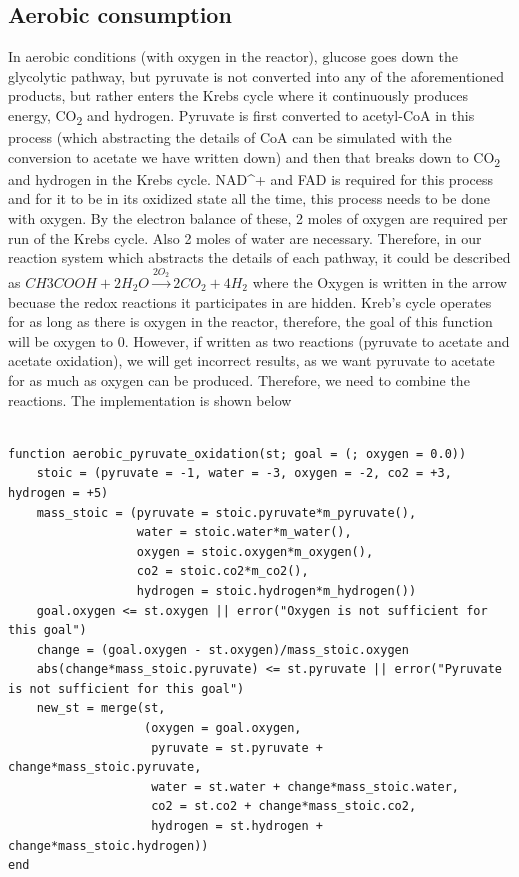 \documentclass[11pt]{article}
\begin{document}
\subsection{Aerobic consumption}
\label{sec:orge4fc921}
In aerobic conditions (with oxygen in the reactor), glucose goes down the glycolytic pathway, but pyruvate is not converted into any of the aforementioned products, but rather enters the Krebs cycle where it continuously produces energy, CO\textsubscript{2} and hydrogen. Pyruvate is first converted to acetyl-CoA in this process (which abstracting the details of CoA can be simulated with the conversion to acetate we have written down) and then that breaks down to CO\textsubscript{2} and hydrogen in the Krebs cycle. NAD\^{}+ and FAD is required for this process and for it to be in its oxidized state all the time, this process needs to be done with oxygen. By the electron balance of these, 2 moles of oxygen are required per run of the Krebs cycle. Also 2 moles of water are necessary. Therefore, in our reaction system which abstracts the details of each pathway, it could be described as \(CH3COOH + 2 H_2O \xrightarrow{2O_2} 2 CO_{2} + 4H_2\) where the Oxygen is written in the arrow becuase the redox reactions it participates in are hidden. Kreb's cycle operates for as long as there is oxygen in the reactor, therefore, the goal of this function will be oxygen to 0. However, if written as two reactions (pyruvate to acetate and acetate oxidation), we will get incorrect results, as we want pyruvate to acetate for as much as oxygen can be produced. Therefore, we need to combine the reactions. The implementation is shown below

\begin{verbatim}

function aerobic_pyruvate_oxidation(st; goal = (; oxygen = 0.0))
    stoic = (pyruvate = -1, water = -3, oxygen = -2, co2 = +3, hydrogen = +5)
    mass_stoic = (pyruvate = stoic.pyruvate*m_pyruvate(),
                  water = stoic.water*m_water(),
                  oxygen = stoic.oxygen*m_oxygen(),
                  co2 = stoic.co2*m_co2(),
                  hydrogen = stoic.hydrogen*m_hydrogen())
    goal.oxygen <= st.oxygen || error("Oxygen is not sufficient for this goal")
    change = (goal.oxygen - st.oxygen)/mass_stoic.oxygen
    abs(change*mass_stoic.pyruvate) <= st.pyruvate || error("Pyruvate is not sufficient for this goal")
    new_st = merge(st,
                   (oxygen = goal.oxygen,
                    pyruvate = st.pyruvate + change*mass_stoic.pyruvate,
                    water = st.water + change*mass_stoic.water,
                    co2 = st.co2 + change*mass_stoic.co2,
                    hydrogen = st.hydrogen + change*mass_stoic.hydrogen))
end

\end{verbatim}
\end{document}
